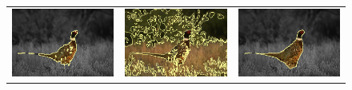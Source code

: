 \documentclass[smallextended]{svjour3}       %
\begin{document}
{{\begin{figure}[hp!]
\begin{tabular}{ccc}
		\includegraphics[scale=0.2]{segmentation_bc_bird_gc-seg.png} &
		\includegraphics[scale=0.2]{segmentation_schoenemann_bird_bird-seg.png} &
		\includegraphics[scale=0.2]{segmentation_bc_bird_corrected-seg.png}\\				

\end{tabular}
\end{figure}}}
\end{document}
